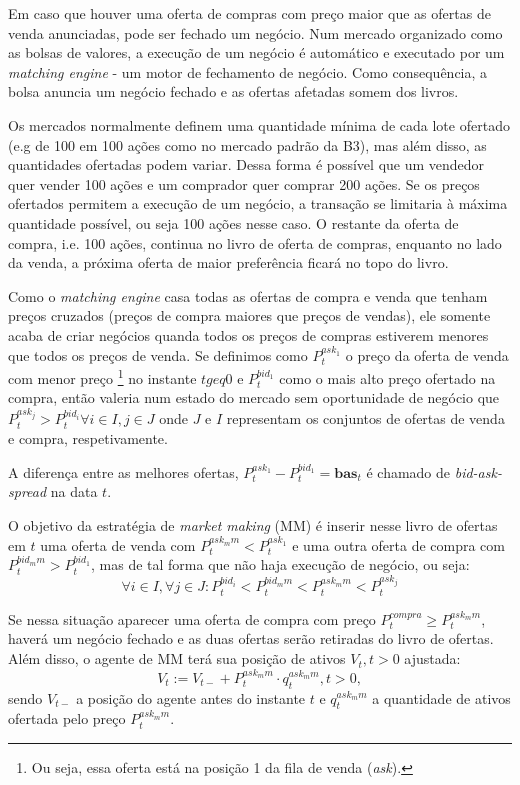 Em caso que houver uma oferta de compras com preço maior que as ofertas de venda anunciadas, pode ser fechado um negócio. Num mercado organizado como as bolsas de valores, a execução de um negócio é automático e executado por um \textit{matching engine} - um motor de fechamento de negócio.
Como consequência, a bolsa anuncia um negócio fechado e as ofertas afetadas somem dos livros.

Os mercados normalmente definem uma quantidade mínima de cada lote ofertado (e.g de 100 em 100 ações como no mercado padrão da B3), mas além disso, as quantidades ofertadas podem variar. Dessa forma é possível que um vendedor quer vender 100 ações e um comprador quer comprar 200 ações. Se os preços ofertados permitem a execução de um negócio, a transação se limitaria à máxima quantidade possível, ou seja 100 ações nesse caso. O restante da oferta de compra, i.e. 100 ações, continua no livro de oferta de compras, enquanto no lado da venda, a próxima oferta de maior preferência ficará no topo do livro.

Como o \textit{matching engine} casa todas as ofertas de compra e venda que tenham preços cruzados (preços de compra maiores que preços de vendas), ele somente acaba de criar negócios quanda todos os preços de compras estiverem menores que todos os preços de venda. 
Se definimos como $P_t^{ask_1}$ o preço da oferta de venda com menor preço \footnote{Ou seja, essa oferta está na posição 1 da fila de venda (\textit{ask}).} no instante $t geq 0$ e $P_t^{bid_1}$ como o mais alto preço ofertado na compra, então valeria num estado do mercado sem oportunidade de negócio que $P_t^{ask_j} > P_t^{bid_i} \forall i \in I, j \in J$ onde $J$ e $I$ representam os conjuntos de ofertas de venda e compra, respetivamente.

A diferença entre as melhores ofertas, $P_t^{ask_1} - P_t^{bid_1} = \mathbf{bas}_t$ é chamado de \textit{bid-ask-spread} na data $t$.

O objetivo da estratégia de \textit{market making} (MM) é inserir nesse livro de ofertas em $t$ uma oferta de venda com $P_t^{ask_mm} < P_t^{ask_1}$ e uma outra oferta de compra com $P_t^{bid_mm} > P_t^{bid_1}$, mas de tal forma que não haja execução de negócio, ou seja:
\begin{equation*}
    \forall{i \in I}, \forall{j \in J}:  P_t^{bid_i} < P_t^{bid_mm} < P_t^{ask_mm} < P_t^{ask_j}
\end{equation*}
    
Se nessa situação aparecer uma oferta de compra com preço $P_t^{compra} \geq P_t^{ask_mm}$, haverá um negócio fechado e as duas ofertas serão retiradas do livro de ofertas. Além disso, o agente de MM terá sua posição de ativos $V_t, t> 0$ ajustada:
\begin{equation*}
    V_t:= V_{t-} + P_t^{ask_mm}\cdot q_t^{ask_mm}, t > 0,
\end{equation*}
sendo $V_{t-}$ a posição do agente antes do instante $t$ e $q_t^{ask_mm}$ a quantidade de ativos ofertada pelo preço $P_t^{ask_mm}$.

